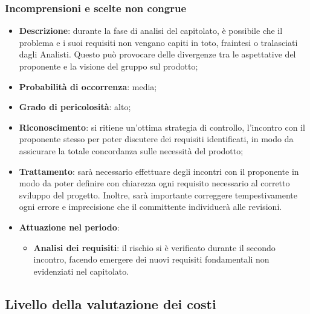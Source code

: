 		\subsubsection{Incomprensioni e scelte non congrue}
		\begin{itemize}
			\item \textbf{Descrizione}: durante la fase di analisi del capitolato, è possibile che il problema e i suoi requisiti non vengano capiti in toto, fraintesi o tralasciati dagli Analisti. Questo può provocare delle divergenze tra le aspettative del proponente e la visione del gruppo sul prodotto;
			\item \textbf{Probabilità di occorrenza}: media;
			\item \textbf{Grado di pericolosità}: alto;
			\item \textbf{Riconoscimento}: si ritiene un'ottima strategia di controllo, l'incontro con il proponente stesso per poter discutere dei requisiti identificati, in modo da assicurare la totale concordanza sulle necessità del prodotto;
			\item \textbf{Trattamento}: sarà necessario effettuare degli incontri con il proponente in modo da poter definire con chiarezza ogni requisito necessario al corretto sviluppo del progetto. Inoltre, sarà importante correggere tempestivamente ogni errore e imprecisione che il committente individuerà alle revisioni. 
			\item \textbf{Attuazione nel periodo}:
			\begin{itemize}
				\item \textbf{Analisi dei requisiti}:  il rischio si è verificato durante il secondo incontro, facendo emergere dei nuovi requisiti fondamentali non evidenziati nel capitolato.
			\end{itemize}
		\end{itemize}
	\subsection{Livello della valutazione dei costi}
